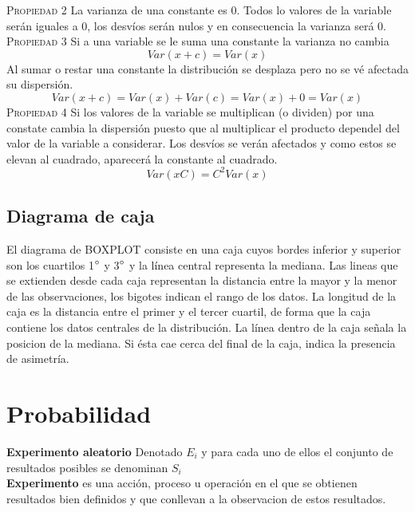 \documentclass[10pt,a4paper]{article}
\begin{document}
\textsc{Propiedad 2} La varianza de una constante es 0. Todos lo valores de la variable serán iguales a 0, los desvíos serán nulos y en consecuencia la varianza será 0.\\

\textsc{Propiedad 3} Si a una variable se le suma una constante la varianza no cambia
\begin{equation}
	Var(x+c)=Var(x)
\end{equation}
Al sumar o restar una constante la distribución se desplaza pero no se vé afectada su dispersión.
\begin{equation}
	Var(x+c)=Var(x)+Var(c)=Var(x)+0=Var(x)
\end{equation}
\textsc{Propiedad 4} Si los valores de la variable se multiplican (o dividen) por una constate cambia la dispersión puesto que al multiplicar el producto dependel del valor de la variable a considerar. Los desvíos se verán afectados y como estos se elevan al cuadrado, aparecerá la constante al cuadrado.
\begin{equation}
	Var(xC)=C^2Var(x)
\end{equation}

\subsection{Diagrama de caja}
El diagrama de BOXPLOT consiste en una caja cuyos bordes inferior y superior son los cuartilos 1$\degree$ y 3$\degree$ y la línea central representa la mediana. Las lineas que se extienden desde cada caja representan la distancia entre la mayor y la menor de las observaciones, los bigotes indican el rango de los datos. La longitud de la caja es la distancia entre el primer y el tercer cuartil, de forma que la caja contiene los datos centrales de la distribución. La línea dentro de la caja señala la posicion de la mediana. Si ésta cae cerca del final de la caja, indica la presencia de asimetría.

\section{Probabilidad}
\textbf{Experimento aleatorio} Denotado $E_i$ y para cada uno de ellos el conjunto de resultados posibles se denominan $S_i$\\

\textbf{Experimento} es una acción, proceso u operación en el que se obtienen resultados bien definidos y que conllevan a la observacion de estos resultados.\\
\end{document}

